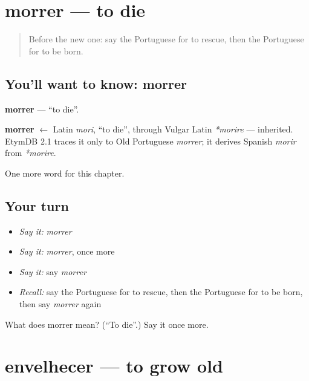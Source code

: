 \section[morrer]{morrer — to die}

\label{lesson:PT-C173-morrer}



\begin{quote}
Before the new one: say the Portuguese for to rescue, then the Portuguese for to be born.
\end{quote}

\subsection*{You'll want to know: morrer}
\textbf{morrer} — \textquotedblleft{}to die\textquotedblright{}.

\begin{cousinweb}
\textbf{morrer} $\leftarrow$ Latin \emph{mori}, \textquotedblleft{}to die\textquotedblright{}, through Vulgar Latin \emph{*morire} — inherited. EtymDB 2.1 traces it only to Old Portuguese \emph{morrer}; it derives Spanish \emph{morir} from \emph{*morire}.
\end{cousinweb}

\begin{grammarlens}[title={What you've built}]
One more word for this chapter.
\end{grammarlens}

\subsection*{Your turn}
\begin{itemize}
\raggedright
  \item \emph{Say it:} \emph{morrer}
  \item \emph{Say it:} \emph{morrer}, once more
  \item \emph{Say it:} say \emph{morrer}
  \item \emph{Recall:} say the Portuguese for to rescue, then the Portuguese for to be born, then say \emph{morrer} again
\end{itemize}

\begin{tcolorbox}[breakable,colback=teal!4,colframe=teal!35!black,title={Before you move on}]
What does morrer mean? (\textquotedblleft{}To die\textquotedblright{}.) Say it once more.
\end{tcolorbox}
\section[envelhecer]{envelhecer — to grow old}


